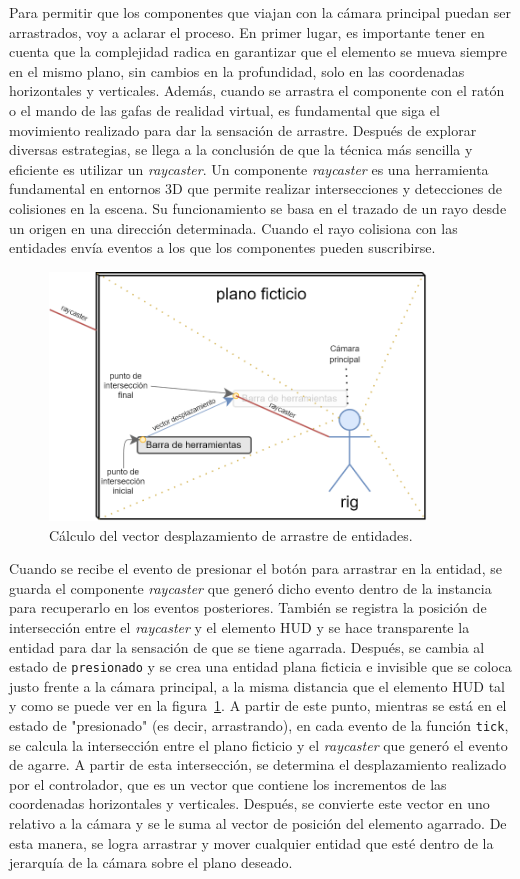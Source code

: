 \documentclass[a4paper, 11pt]{book}
\begin{document}
Para permitir que los componentes que viajan con la cámara principal puedan ser arrastrados, voy a aclarar el proceso. En primer lugar, es importante tener en cuenta que la complejidad radica en garantizar que el elemento se mueva siempre en el mismo plano, sin cambios en la profundidad, solo en las coordenadas horizontales y verticales.
Además, cuando se arrastra el componente con el ratón o el mando de las gafas de realidad virtual, es fundamental que siga el movimiento realizado para dar la sensación de arrastre.
Después de explorar diversas estrategias, se llega a la conclusión de que la técnica más sencilla y eficiente es utilizar un \emph{\gls{raycaster}}. Un componente \emph{raycaster} es una herramienta fundamental en entornos \textsc{3D} que permite realizar intersecciones y detecciones de colisiones en la escena. Su funcionamiento se basa en el trazado de un rayo desde un origen en una dirección determinada. Cuando el rayo colisiona con las entidades envía eventos a los que los componentes pueden suscribirse.\\
\begin{figure}[h]
	\centering
	\includegraphics[width=10cm, keepaspectratio]{img/custom-draggable.png}
	\caption{Cálculo del vector desplazamiento de arrastre de entidades.}
	\label{fig:raycaster}
\end{figure}
Cuando se recibe el evento de presionar el botón para arrastrar en la entidad, se guarda el componente \emph{raycaster} que generó dicho evento dentro de la instancia para recuperarlo en los eventos posteriores. 
También se registra la posición de intersección entre el \emph{raycaster} y el elemento \textsc{\gls{HUD}} y se hace transparente la entidad para dar la sensación de que se tiene agarrada. Después, se cambia al estado de \texttt{presionado} y se crea una entidad plana ficticia e invisible que se coloca justo frente a la cámara principal, a la misma distancia que el elemento \textsc{\gls{HUD}} tal y como se puede ver en la figura~\ref{fig:raycaster}. A partir de este punto, mientras se está en el estado de "presionado" (es decir, arrastrando), en cada evento de la función \texttt{tick}, se calcula la intersección entre el plano ficticio y el \emph{raycaster} que generó el evento de agarre. A partir de esta intersección, se determina el desplazamiento realizado por el controlador, que es un vector que contiene los incrementos de las coordenadas horizontales y verticales. Después, se convierte este vector en uno relativo a la cámara y se le suma al vector de posición del elemento agarrado. De esta manera, se logra arrastrar y mover cualquier entidad que esté dentro de la jerarquía de la cámara sobre el plano deseado.
\end{document}
